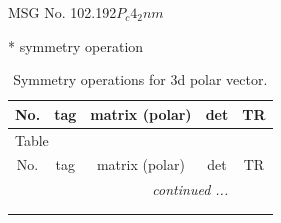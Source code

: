 \documentclass[fleqn,8pt]{jsarticle}
\begin{document}
\setcounter{MaxMatrixCols}{32}

\renewcommand{\tablename}{Table~}
\renewcommand{\figurename}{Figure~}
\begin{center}
\LARGE
MSG No. 102.192\quad$P_{c}4_{2}nm$
\end{center}
* symmetry operation
\renewcommand{\arraystretch}{1.3}
\begin{longtable}{ccccc}
\caption{Symmetry operations for 3d polar vector.}
 \\
 \hline \hline
No. & tag & matrix (polar) & det & TR \\ \hline \endfirsthead

\multicolumn{4}{l}{\tablename\ \thetable{}} \\
 \hline \hline
No. & tag & matrix (polar) & det & TR \\ \hline \endhead

 \hline \hline
\multicolumn{4}{r}{\footnotesize\it continued ...} \\ \endfoot

 \hline \hline
\multicolumn{4}{r}{} \\ \endlastfoot


\end{longtable}
\end{document}
